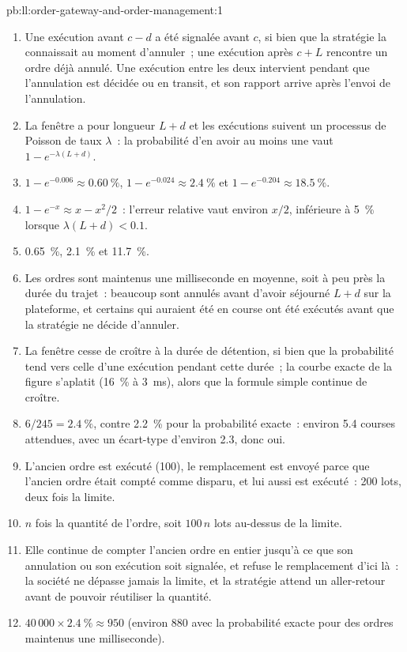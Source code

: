 \begin{solution}{pb:ll:order-gateway-and-order-management:1}
\begin{enumerate}
\item Une exécution avant $c - d$ a été signalée avant $c$, si bien que la stratégie la connaissait au moment d'annuler~; une exécution après $c + L$ rencontre un
ordre déjà annulé. Une exécution entre les deux intervient pendant que l'annulation est décidée ou en transit, et son rapport
arrive après l'envoi de l'annulation.
\item La fenêtre a pour longueur $L + d$ et les exécutions suivent un processus de Poisson de taux $\lambda$~: la probabilité d'en avoir au moins une vaut
$1 - e^{-\lambda (L + d)}$.
\item $1 - e^{-0.006} \approx 0.60~\%$, $1 - e^{-0.024} \approx 2.4~\%$ et $1 - e^{-0.204} \approx 18.5~\%$.
\item $1 - e^{-x} \approx x - x^2/2$~: l'erreur relative vaut environ $x/2$, inférieure à 5~\% lorsque $\lambda(L + d) < 0.1$.
\item 0.65~\%, 2.1~\% et 11.7~\%.
\item Les ordres sont maintenus une milliseconde en moyenne, soit à peu près la durée du trajet~: beaucoup sont annulés avant d'avoir
séjourné $L + d$ sur la plateforme, et certains qui auraient été en course ont été exécutés avant que la stratégie ne décide d'annuler.
\item La fenêtre cesse de croître à la durée de détention, si bien que la probabilité tend vers celle d'une exécution pendant cette durée~; la
courbe exacte de la figure s'aplatit (16~\% à \qty{3}{\milli\second}), alors que la formule simple continue de croître.
\item $6 / 245 = 2.4~\%$, contre 2.2~\% pour la probabilité exacte~: environ 5.4 courses attendues, avec un écart-type d'environ
2.3, donc oui.
\item L'ancien ordre est exécuté (100), le remplacement est envoyé parce que l'ancien ordre était compté comme disparu, et lui aussi est exécuté~: 200
lots, deux fois la limite.
\item $n$ fois la quantité de l'ordre, soit $100\,n$ lots au-dessus de la limite.
\item Elle continue de compter l'ancien ordre en entier jusqu'à ce que son annulation ou son exécution soit signalée, et refuse le remplacement
d'ici là~: la société ne dépasse jamais la limite, et la stratégie attend un aller-retour avant de pouvoir réutiliser la quantité.
\item $40\,000 \times 2.4~\% \approx 950$ (environ 880 avec la probabilité exacte pour des ordres maintenus une milliseconde).

\end{enumerate}
\end{solution}
